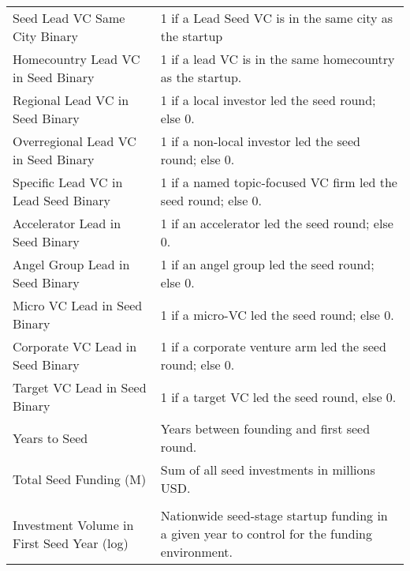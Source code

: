 {\begin{tabular}{p{} p{}}
Seed Lead VC Same City Binary & 1 if a Lead Seed VC is in the same city as the startup \\[0.4em]
Homecountry Lead VC in Seed Binary & 1 if a lead VC is in the same homecountry as the startup. \\[0.4em]
Regional Lead VC in Seed Binary & 1 if a local investor led the seed round; else 0. \\[0.4em]
Overregional Lead VC in Seed Binary & 1 if a non-local investor led the seed round; else 0. \\[0.4em]
Specific Lead VC in Lead Seed Binary & 1 if a named topic-focused VC firm led the seed round; else 0. \\[0.4em]
Accelerator Lead in Seed Binary & 1 if an accelerator led the seed round; else 0. \\[0.4em]
Angel Group Lead in Seed Binary & 1 if an angel group led the seed round; else 0. \\[0.4em]
Micro VC Lead in Seed Binary & 1 if a micro-VC led the seed round; else 0. \\[0.4em]
Corporate VC Lead in Seed Binary & 1 if a corporate venture arm led the seed round; else 0. \\[0.4em]
Target VC Lead in Seed Binary & 1 if a target VC led the seed round, else 0. \\[0.4em]
Years to Seed & Years between founding and first seed round. \\[0.4em]
Total Seed Funding (M) & Sum of all seed investments in millions USD. \\[0.4em]
\addlinespace[0.5em]
\midrule
\multicolumn{2}{c}{\tiny\textsc{CONTROL VARIABLES}} \\
\midrule
Investment Volume in First Seed Year (log) & Nationwide seed-stage startup funding in a given year to control for the funding environment. \\[0.4em]
\bottomrule
\end{tabular}
}

